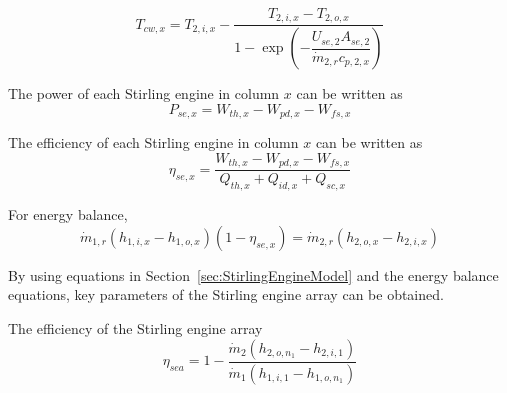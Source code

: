 \begin{equation}
	T_{cw,x}=T_{2,i,x}-\dfrac{T_{2,i,x}-T_{2,o,x}}{1-\exp(-\dfrac{U_{se,2}A_{se,2}}{\dot{m}_{2,r}c_{p,2,x}})}\label{eq:T_L_x}
\end{equation}

The power of each Stirling engine in column $x$ can be written as 
\begin{equation}
  P_{se,x} = W_{th,x}-W_{pd,x}-W_{fs,x}
\end{equation}

The efficiency of each Stirling engine in column $x$ can be written as 
\begin{equation}
  \eta_{se,x} = \dfrac{W_{th,x}-W_{pd,x}-W_{fs,x}}{Q_{th,x}+Q_{id,x}+Q_{sc,x}}
\end{equation}



For energy balance,
\begin{equation}
	\dot{m}_{1,r}(h_{1,i,x}-h_{1,o,x})(1-\eta_{se,x})=\dot{m}_{2,r}(h_{2,o,x}-h_{2,i,x})
\end{equation}


By using equations in Section~\ref{sec:StirlingEngineModel} and the energy balance equations, key parameters of the Stirling engine array can be obtained. 

The efficiency of the Stirling engine array 
\begin{equation}
  \eta_{sea}=1-\dfrac{\dot{m}_{2}(h_{2,o,n_1}-h_{2,i,1})}{\dot{m}_{1}(h_{1,i,1}-h_{1,o,n_1})}
\end{equation}

